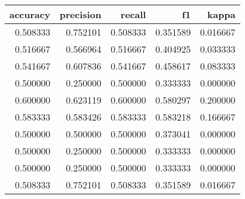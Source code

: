 \begin{tabular}{rrrrr}
\toprule
accuracy & precision & recall & f1 & kappa \\
\midrule
0.508333 & 0.752101 & 0.508333 & 0.351589 & 0.016667 \\
0.516667 & 0.566964 & 0.516667 & 0.404925 & 0.033333 \\
0.541667 & 0.607836 & 0.541667 & 0.458617 & 0.083333 \\
0.500000 & 0.250000 & 0.500000 & 0.333333 & 0.000000 \\
0.600000 & 0.623119 & 0.600000 & 0.580297 & 0.200000 \\
0.583333 & 0.583426 & 0.583333 & 0.583218 & 0.166667 \\
0.500000 & 0.500000 & 0.500000 & 0.373041 & 0.000000 \\
0.500000 & 0.250000 & 0.500000 & 0.333333 & 0.000000 \\
0.500000 & 0.250000 & 0.500000 & 0.333333 & 0.000000 \\
0.508333 & 0.752101 & 0.508333 & 0.351589 & 0.016667 \\
\bottomrule
\end{tabular}
